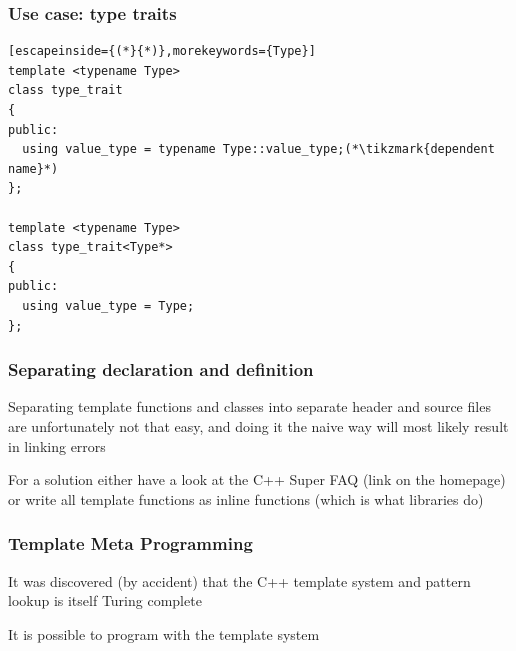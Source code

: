 \documentclass[14pt,a4paper,dvipsnames,usenames]{beamer}
\begin{document}
\begin{frame}[fragile]
  \frametitle{Use case: type traits}

  \begin{lstlisting}[escapeinside={(*}{*)},morekeywords={Type}]
template <typename Type>
class type_trait
{
public:
  using value_type = typename Type::value_type;(*\tikzmark{dependent name}*)
};

template <typename Type>
class type_trait<Type*>
{
public:
  using value_type = Type;
};
  \end{lstlisting}


\end{frame}

\begin{frame}[fragile]
  \frametitle{Separating declaration and definition}

  Separating template functions and classes into separate header and source files
  are unfortunately not that easy, and doing it the naive way will most likely result 
  in linking errors

  \vspace{1cm}
  For a solution either have a look at the C++ Super FAQ {\footnotesize (link on the homepage)} or
  write all template functions as inline functions {\footnotesize (which is what libraries do)}
  
\end{frame}

\begin{frame}[fragile]
  \frametitle{Template Meta Programming}

  It was discovered {\fontsize{8pt}{8pt}\selectfont\color{Marty}(by accident)} that the C++ template system and pattern lookup
  is itself Turing complete

  \vspace{1cm}
  It is possible to program with the template system
  
\end{frame}
\end{document}
